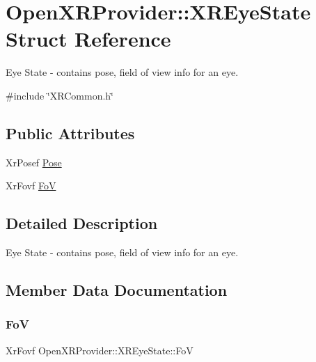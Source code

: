 \hypertarget{struct_open_x_r_provider_1_1_x_r_eye_state}{}\section{Open\+X\+R\+Provider\+::X\+R\+Eye\+State Struct Reference}
\label{struct_open_x_r_provider_1_1_x_r_eye_state}


Eye State -\/ contains pose, field of view info for an eye.  




{\ttfamily \#include \char`\"{}X\+R\+Common.\+h\char`\"{}}

\subsection*{Public Attributes}
\begin{DoxyCompactItemize}
\item 
Xr\+Posef \mbox{\hyperlink{struct_open_x_r_provider_1_1_x_r_eye_state_a67d63a2e3f4ea9c04f80bed7747f9e3d}{Pose}}
\item 
Xr\+Fovf \mbox{\hyperlink{struct_open_x_r_provider_1_1_x_r_eye_state_a4fd9c348f86def5a6e597e5cba63a10a}{FoV}}
\end{DoxyCompactItemize}


\subsection{Detailed Description}
Eye State -\/ contains pose, field of view info for an eye. 

\subsection{Member Data Documentation}
\mbox{\label{struct_open_x_r_provider_1_1_x_r_eye_state_a4fd9c348f86def5a6e597e5cba63a10a}} 
\subsubsection{\texorpdfstring{FoV}{FoV}}
{\footnotesize\ttfamily Xr\+Fovf Open\+X\+R\+Provider\+::\+X\+R\+Eye\+State\+::\+FoV}

\mbox{\label{struct_open_x_r_provider_1_1_x_r_eye_state_a67d63a2e3f4ea9c04f80bed7747f9e3d}} 
